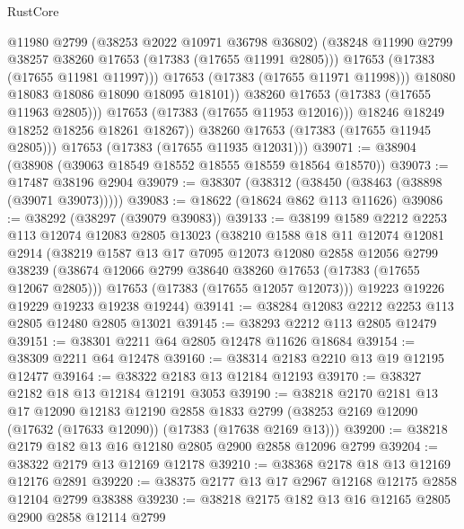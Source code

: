 \begin{lexlean}{RustCore}
\begin{coremodule}
                        @11980
                        @2799
                        (@38253 @2022 @10971 @36798 @36802)
                        (@38248 @11990 @2799 @38257 @38260 @17653 (@17383 (@17655 @11991 @2805)))
                        @17653
                        (@17383 (@17655 @11981 @11997)))
                      @17653
                      (@17383 (@17655 @11971 @11998)))
                    @18080
                    @18083
                    @18086
                    @18090
                    @18095
                    @18101))
                @38260
                @17653
                (@17383 (@17655 @11963 @2805)))
              @17653
              (@17383 (@17655 @11953 @12016)))
            @18246
            @18249
            @18252
            @18256
            @18261
            @18267))
        @38260
        @17653
        (@17383 (@17655 @11945 @2805)))
      @17653
      (@17383 (@17655 @11935 @12031)))
@39071 := @38904 (@38908 (@39063 @18549 @18552 @18555 @18559 @18564 @18570))
@39073 := @17487 @38196 @2904
@39079 := @38307 (@38312 (@38450 (@38463 (@38898 (@39071 @39073)))))
@39083 := @18622 (@18624 @862 @113 @11626)
@39086 := @38292 (@38297 (@39079 @39083))
@39133 := @38199
    @1589
    @2212
    @2253
    @113
    @12074
    @12083
    @2805
    @13023
    (@38210
      @1588
      @18
      @11
      @12074
      @12081
      @2914
      (@38219
        @1587
        @13
        @17
        @7095
        @12073
        @12080
        @2858
        @12056
        @2799
        @38239
        (@38674 @12066 @2799 @38640 @38260 @17653 (@17383 (@17655 @12067 @2805)))
        @17653
        (@17383 (@17655 @12057 @12073)))
      @19223
      @19226
      @19229
      @19233
      @19238
      @19244)
@39141 := @38284 @12083 @2212 @2253 @113 @2805 @12480 @2805 @13021
@39145 := @38293 @2212 @113 @2805 @12479
@39151 := @38301 @2211 @64 @2805 @12478 @11626 @18684
@39154 := @38309 @2211 @64 @12478
@39160 := @38314 @2183 @2210 @13 @19 @12195 @12477
@39164 := @38322 @2183 @13 @12184 @12193
@39170 := @38327 @2182 @18 @13 @12184 @12191 @3053
@39190 := @38218
    @2170
    @2181
    @13
    @17
    @12090
    @12183
    @12190
    @2858
    @1833
    @2799
    (@38253 @2169 @12090 (@17632 (@17633 @12090)) (@17383 (@17638 @2169 @13)))
@39200 := @38218 @2179 @182 @13 @16 @12180 @2805 @2900 @2858 @12096 @2799
@39204 := @38322 @2179 @13 @12169 @12178
@39210 := @38368 @2178 @18 @13 @12169 @12176 @2891
@39220 := @38375 @2177 @13 @17 @2967 @12168 @12175 @2858 @12104 @2799 @38388
@39230 := @38218 @2175 @182 @13 @16 @12165 @2805 @2900 @2858 @12114 @2799

\end{coremodule}
\end{lexlean}
